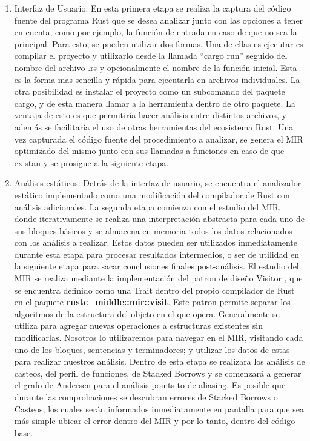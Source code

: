 \begin{enumerate}
    \item Interfaz de Usuario: En esta primera etapa se realiza la captura del código fuente del programa Rust que se desea analizar junto con las opciones a tener en cuenta, como por ejemplo, la función de entrada en caso de que no sea la principal. Para esto, se pueden utilizar dos formas. Una de ellas es ejecutar es compilar el proyecto y utilizarlo desde la llamada ``cargo run'' seguido del nombre del archivo .rs y opcionalmente el nombre de la función inicial. Esta es la forma mas sencilla y rápida para ejecutarla en archivos individuales. La otra posibilidad es instalar el proyecto como un subcomando del paquete cargo, y de esta manera llamar a la herramienta dentro de otro paquete. La ventaja de esto es que permitiría hacer análisis entre distintos archivos, y además se facilitaría el uso de otras herramientas del ecosistema Rust. Una vez capturada el código fuente del procedimiento a analizar, se genera el MIR optimizado del mismo junto con sus llamadas a funciones en caso de que existan y se prosigue a la siguiente etapa.
    \item Análisis estáticos: Detrás de la interfaz de usuario, se encuentra el analizador estático implementado como una modificación del compilador de Rust con análisis adicionales. La segunda etapa comienza con el estudio del MIR, donde iterativamente se realiza una interpretación abstracta para cada uno de sus bloques básicos y se almacena en memoria todos los datos relacionados con los análisis a realizar. Estos datos pueden ser utilizados inmediatamente durante esta etapa para procesar resultados intermedios, o ser de utilidad en la siguiente etapa para sacar conclusiones finales post-análisis.
    El estudio del MIR se realiza mediante la implementación del patron de diseño Visitor \cite{ingienieriasoftware}, que se encuentra definido como una Trait dentro del propio compilador de Rust en el paquete \textbf{rustc\_middle::mir::visit}. Este patron permite separar los algoritmos de la estructura del objeto en el que opera. Generalmente se utiliza para agregar nuevas operaciones a estructuras existentes sin modificarlas. Nosotros lo utilizaremos para navegar en el MIR, visitando cada uno de los bloques, sentencias y terminadores; y utilizar los datos de estas para realizar nuestros análisis.
    Dentro de esta etapa se realizara los análisis de casteos, del perfil de funciones, de Stacked Borrows y se comenzará a generar el grafo de Andersen para el análisis points-to de aliasing. Es posible que durante las comprobaciones se descubran errores de Stacked Borrows o Casteos, los cuales serán informados inmediatamente en pantalla para que sea más simple ubicar el error dentro del MIR y por lo tanto, dentro del código base.

\end{enumerate}
